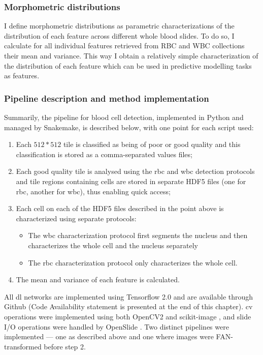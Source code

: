 \subsubsection{Morphometric distributions}

I define morphometric distributions as parametric characterizations of the distribution of each feature across different whole blood slides. To do so, I calculate for all individual features retrieved from RBC and WBC collections their mean and variance. This way I obtain a relatively simple characterization of the distribution of each feature which can be used in predictive modelling tasks as features.

\subsubsection{Pipeline description and method implementation}

Summarily, the pipeline for blood cell detection, implemented in Python and managed by Snakemake, is described below, with one point for each script used:

\begin{enumerate}
    \item Each $512*512$ tile is classified as being of poor or good quality and this classification is stored as a comma-separated values files;
    \item Each good quality tile is analysed using the \ac{rbc} and \ac{wbc} detection protocols and tile regions containing cells are stored in separate HDF5 files (one for \ac{rbc}, another for \ac{wbc}), thus enabling quick access;
    \item Each cell on each of the HDF5 files described in the point above is characterized using separate protocols:
    \begin{itemize}
        \item The \ac{wbc} characterization protocol first segments the nucleus and then characterizes the whole cell and the nucleus separately
        \item The \ac{rbc} characterization protocol only characterizes the whole cell.
    \end{itemize}
    \item The mean and variance of each feature is calculated.
\end{enumerate}

All \ac{dl} networks are implemented using Tensorflow 2.0 \cite{tensorflow2015-whitepaper} and are available through Github (Code Availability statement is presented at the end of this chapter). \Ac{cv} operations were implemented using both OpenCV2 \cite{opencv_library} and scikit-image \cite{van2014scikit}, and slide I/O operations were handled by OpenSlide \cite{Goode2013-zs}. Two distinct pipelines were implemented --- one as described above and one where images were FAN-transformed before step 2.

